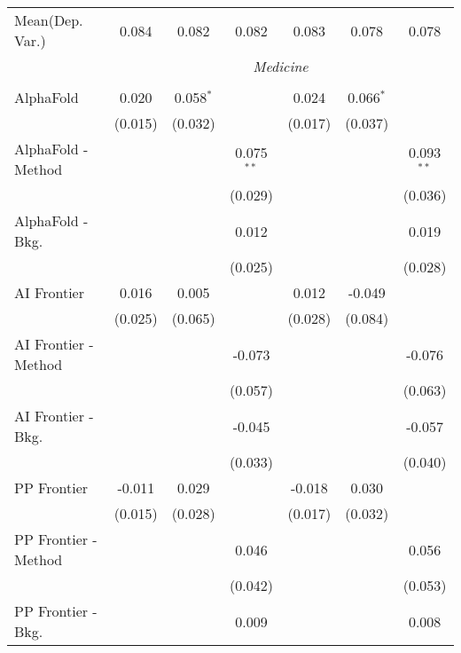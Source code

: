 \begin{tabular}{lcccccc}
Mean(Dep. Var.) & 0.084 & 0.082 & 0.082 & 0.083 & 0.078 & 0.078 \\
 & \multicolumn{6}{c}{\textit{Medicine}} \\ \\
   AlphaFold            & 0.020   & 0.058$^{*}$ &               & 0.024   & 0.066$^{*}$ &   \\   
                        & (0.015) & (0.032)     &               & (0.017) & (0.037)     &   \\   
   AlphaFold - Method   &         &             & 0.075$^{**}$  &         &             & 0.093$^{**}$\\   
                        &         &             & (0.029)       &         &             & (0.036)\\   
   AlphaFold - Bkg.     &         &             & 0.012         &         &             & 0.019\\   
                        &         &             & (0.025)       &         &             & (0.028)\\   
   AI Frontier          & 0.016   & 0.005       &               & 0.012   & -0.049      &   \\   
                        & (0.025) & (0.065)     &               & (0.028) & (0.084)     &   \\   
   AI Frontier - Method &         &             & -0.073        &         &             & -0.076\\   
                        &         &             & (0.057)       &         &             & (0.063)\\   
   AI Frontier - Bkg.   &         &             & -0.045        &         &             & -0.057\\   
                        &         &             & (0.033)       &         &             & (0.040)\\   
   PP Frontier          & -0.011  & 0.029       &               & -0.018  & 0.030       &   \\   
                        & (0.015) & (0.028)     &               & (0.017) & (0.032)     &   \\   
   PP Frontier - Method &         &             & 0.046         &         &             & 0.056\\   
                        &         &             & (0.042)       &         &             & (0.053)\\   
   PP Frontier - Bkg.   &         &             & 0.009         &         &             & 0.008\\   

\end{tabular}

